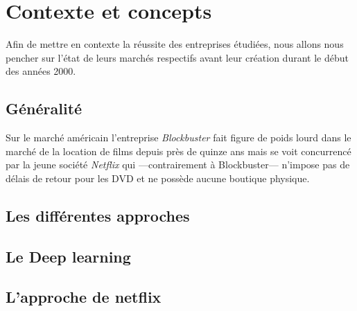 \chapter{Contexte et concepts}



      


Afin de mettre en contexte la réussite des entreprises étudiées, nous allons nous pencher sur l'état de leurs marchés respectifs avant leur création durant le début des années 2000.

\section{Généralité}

Sur le marché américain l'entreprise \textit{Blockbuster} fait figure de poids lourd dans le marché de la location de films depuis près de quinze ans mais se voit concurrencé par la jeune société \textit{Netflix} qui ---contrairement à Blockbuster--- n'impose pas de délais de retour pour les DVD et ne possède aucune boutique physique. 

\section{Les différentes approches}
\section{Le Deep learning}
\section{L'approche de netflix}
